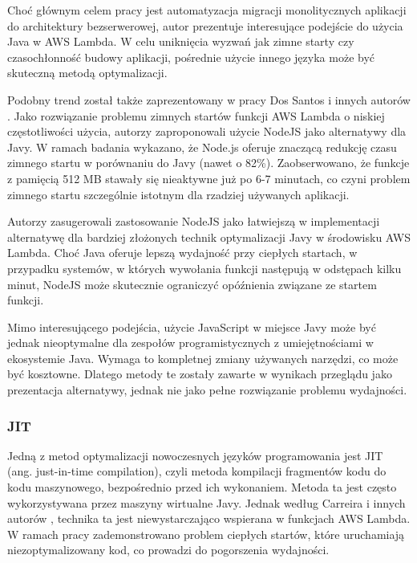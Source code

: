 Choć głównym celem pracy jest automatyzacja migracji monolitycznych aplikacji do architektury bezserwerowej, autor prezentuje interesujące podejście do użycia Java w AWS Lambda.
W celu uniknięcia wyzwań jak zimne starty czy czasochłonność budowy aplikacji, pośrednie użycie innego języka może być skuteczną metodą optymalizacji.

Podobny trend został także zaprezentowany w pracy Dos Santos i innych autorów \cite{FerreiraDosSantos2023}.
Jako rozwiązanie problemu zimnych startów funkcji AWS Lambda o niskiej częstotliwości użycia, autorzy zaproponowali użycie NodeJS jako alternatywy dla Javy.
W ramach badania wykazano, że Node.js oferuje znaczącą redukcję czasu zimnego startu w porównaniu do Javy (nawet o 82\%). 
Zaobserwowano, że funkcje z pamięcią 512 MB stawały się nieaktywne już po 6-7 minutach, co czyni problem zimnego startu szczególnie istotnym dla rzadziej używanych aplikacji.

Autorzy zasugerowali zastosowanie NodeJS jako łatwiejszą w implementacji alternatywę dla bardziej złożonych technik optymalizacji Javy w środowisku AWS Lambda. 
Choć Java oferuje lepszą wydajność przy ciepłych startach, w przypadku systemów, w których wywołania funkcji następują w odstępach kilku minut, NodeJS może skutecznie ograniczyć opóźnienia związane ze startem funkcji.

Mimo interesującego podejścia, użycie JavaScript w miejsce Javy może być jednak nieoptymalne dla zespołów programistycznych z umiejętnościami w ekosystemie Java. 
Wymaga to kompletnej zmiany używanych narzędzi, co może być kosztowne. Dlatego metody te zostały zawarte w wynikach przeglądu jako prezentacja alternatywy, jednak nie jako pełne rozwiązanie problemu wydajności.

\subsubsection*{JIT}

Jedną z metod optymalizacji nowoczesnych języków programowania jest JIT (ang. just-in-time compilation), czyli metoda kompilacji fragmentów kodu do kodu maszynowego, bezpośrednio przed ich wykonaniem.
Metoda ta jest często wykorzystywana przez maszyny wirtualne Javy. Jednak według Carreira i innych autorów \cite{10.1145/3458336.3465305}, technika ta jest niewystarczająco wspierana w funkcjach AWS Lambda.
W ramach pracy zademonstrowano problem ciepłych startów, które uruchamiają niezoptymalizowany kod, co prowadzi do pogorszenia wydajności.

